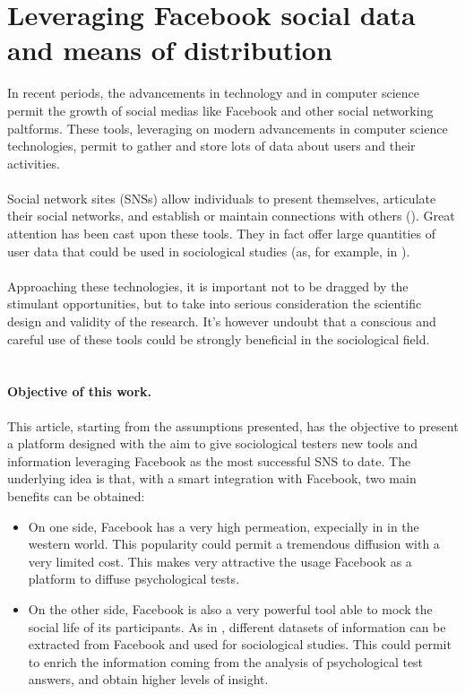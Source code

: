 \section{Leveraging Facebook social data and means of distribution}
In recent periods, the advancements in technology and in computer science permit the growth of social medias like Facebook and other social networking paltforms.
These tools, leveraging on modern advancements in computer science technologies, permit to gather and store lots of data about users and their activities.\\
\\
Social network sites (SNSs) allow individuals to present themselves, articulate their social networks, and establish or maintain connections with others
(\cite{Boyd-2007}).
Great attention has been cast upon these tools.
They in fact offer large quantities of user data that could be used in sociological studies (as, for example, in \cite{Ellison-2007}).\\
\\
Approaching these technologies, it is important not to be dragged by the stimulant opportunities, but to take into serious consideration the scientiﬁc design and
validity of the research.
It’s however undoubt that a conscious and careful use of these tools could be strongly beneﬁcial in the sociological ﬁeld.\\
\\
\paragraph{Objective of this work.}
This article, starting from the assumptions presented, has the objective to present a platform designed with the aim to give sociological testers new tools and
information leveraging Facebook as the most successful SNS to date.
The underlying idea is that, with a smart integration with Facebook, two main beneﬁts can be obtained:

\begin{itemize}
\item On one side, Facebook has a very high permeation, expecially in in the western world.
This popularity could permit a tremendous diffusion with a very limited cost.
This makes very attractive the usage Facebook as a platform to diffuse psychological tests.
\item On the other side, Facebook is also a very powerful tool able to mock the social life of its participants.
As in \cite{Lewis-2008}, different datasets of information can be extracted from Facebook and used for sociological studies.
This could permit to enrich the information coming from the analysis of psychological test answers, and obtain higher levels of insight.
\end{itemize}

